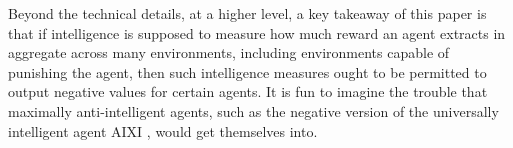 \documentclass{article}
\begin{document}
Beyond the technical details, at a higher level, a key takeaway of
this paper is that if intelligence is supposed to measure how much
reward an agent extracts in aggregate across many environments,
including environments capable of punishing the agent, then such
intelligence measures ought to be permitted to output negative
values for certain agents. It is fun to imagine the trouble
that maximally anti-intelligent
agents, such as the negative version of the universally intelligent
agent AIXI \cite{hutter2004universal}, would get themselves into.




\end{document}
